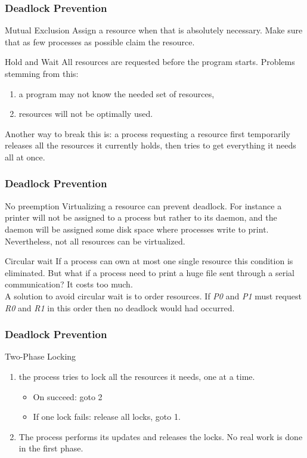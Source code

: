 \begin{frame}
  \frametitle{Deadlock Prevention}
  \begin{block}{Mutual Exclusion}
    Assign a resource when that is absolutely necessary. Make sure that as few processes as possible claim the resource.
  \end{block}
  \begin{block}{Hold and Wait}
    All resources are requested before the program starts. Problems stemming from this:
    \begin{enumerate}
      \item a program may not know the needed set of resources,
      \item resources will not be optimally used.
    \end{enumerate}
    Another way to break this is: a process requesting a resource first temporarily releases all the resources it currently holds, then tries to get everything it needs all at once.
  \end{block}
\end{frame}

\begin{frame}
  \frametitle{Deadlock Prevention}
  \begin{block}{No preemption}
    Virtualizing a resource can prevent deadlock. For instance a printer will not be assigned to a process but rather to its daemon, and the daemon will be assigned some disk space where processes write to print. Nevertheless, not all resources can be virtualized.
  \end{block}
  \begin{block}{Circular wait}
    If a process can own at most one single resource this condition is eliminated. But what if a process need to print a huge file sent through a serial communication? It costs too much.\\
    A solution to avoid circular wait is to order resources. If \emph{P0} and \emph{P1} must request \emph{R0} and \emph{R1} in this order then no deadlock would had occurred.
  \end{block}
\end{frame}

\begin{frame}
  \frametitle{Deadlock Prevention}
  \begin{block}{Two-Phase Locking}
    \begin{enumerate}
      \item the process tries to lock all the resources it needs, one at a time.
        \begin{itemize}
          \item On succeed: goto 2
          \item If one lock fails: release all locks, goto 1.
        \end{itemize}
      \item The process performs its updates and releases the locks. No real work is done in the first phase.
    \end{enumerate}
  \end{block}
\end{frame}

